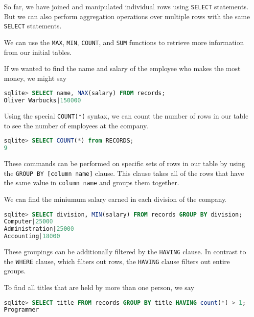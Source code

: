 So far, we have joined and manipulated individual rows using \texttt{SELECT}
statements.  But we can also perform aggregation operations over multiple rows
with the same \texttt{SELECT} statements.

We can use the \texttt{MAX}, \texttt{MIN}, \texttt{COUNT}, and \texttt{SUM}
functions to retrieve more information from our initial tables.

If we wanted to find the name and salary of the employee who makes the most
money, we might say

\begin{lstlisting}[language=SQL]
sqlite> SELECT name, MAX(salary) FROM records;
Oliver Warbucks|150000
\end{lstlisting}

\begin{minipage}{\textwidth}
Using the special \texttt{COUNT(*)} syntax, we can count the number of rows in
our table to see the number of employees at the company.

\begin{lstlisting}[language=SQL]
sqlite> SELECT COUNT(*) from RECORDS;
9
\end{lstlisting}
\end{minipage}

These commands can be performed on specific sets of rows in our table by using
the \texttt{GROUP BY [column name]} clause.  This clause takes all of the rows
that have the same value in \texttt{column name} and groups them together.

We can find the miniumum salary earned in each division of the company.

\begin{lstlisting}[language=SQL]
sqlite> SELECT division, MIN(salary) FROM records GROUP BY division;
Computer|25000
Administration|25000
Accounting|18000
\end{lstlisting}

These groupings can be additionally filtered by the \texttt{HAVING} clause.
In contrast to the \texttt{WHERE} clause, which filters out rows, the \texttt{HAVING}
clause filters out entire groups.

To find all titles that are held by more than one person, we say

\begin{lstlisting}[language=SQL]
sqlite> SELECT title FROM records GROUP BY title HAVING count(*) > 1;
Programmer
\end{lstlisting}
